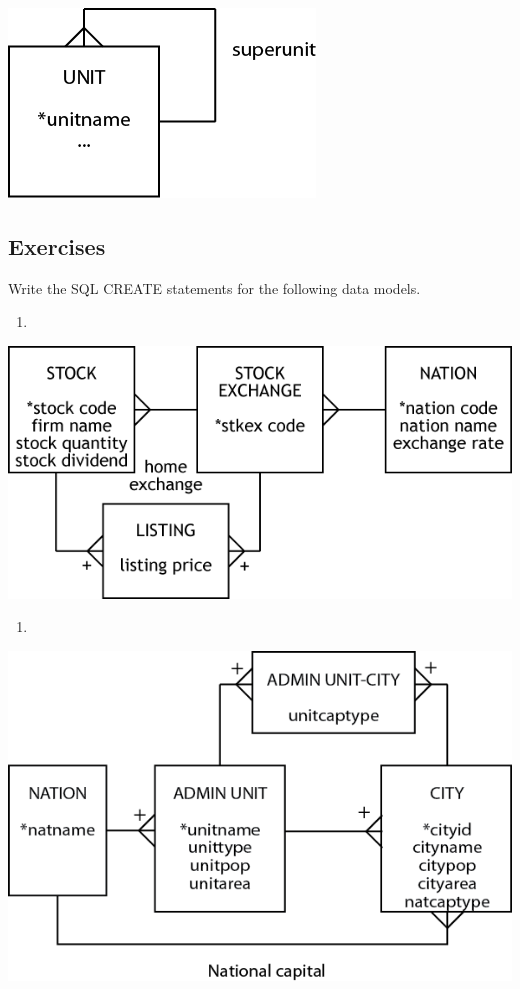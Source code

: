 \documentclass[
]{article}
\providecommand{\tightlist}{%
  \setlength{\itemsep}{0pt}\setlength{\parskip}{0pt}}
\begin{document}
\includegraphics{Figures/Reference 1/r1-flextree.png}

\hypertarget{exercises-6}{%
\subsection*{Exercises}\label{exercises-6}}

Write the SQL CREATE statements for the following data models.

\begin{enumerate}
\def\labelenumi{\arabic{enumi}.}
\tightlist
\item
\end{enumerate}

\includegraphics{Figures/Chapter 7/revised NATION-STOCK.png}

\begin{enumerate}
\def\labelenumi{\arabic{enumi}.}
\setcounter{enumi}{1}
\tightlist
\item
\end{enumerate}

\includegraphics{Figures/Chapter 7/geography revised.png}
\end{document}
